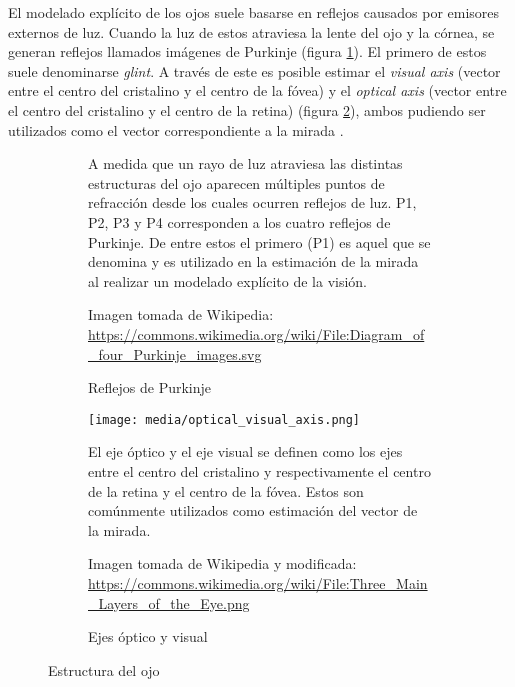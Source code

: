 El modelado explícito de los ojos suele basarse en reflejos causados por
emisores externos de luz.
Cuando la luz de estos atraviesa la lente del ojo y la córnea, se generan
reflejos llamados imágenes de Purkinje (figura \ref{fig:purkinje_images}).
El primero de estos suele denominarse \textit{glint}.
A través de este es posible estimar el \textit{visual axis} (vector entre el
centro del cristalino y el centro de la fóvea) y el \textit{optical axis}
(vector entre el centro del cristalino y el centro de la retina) (figura
\ref{fig:optical_visual_axis}), ambos pudiendo ser utilizados como el vector
correspondiente a la mirada \cite{hansen_2009_eye_of_the_beholder}.

\begin{figure}
    \centering

    \begin{subfigure}{\linewidth}
      \centering

      

      A medida que un rayo de luz atraviesa las distintas estructuras del ojo
      aparecen múltiples puntos de refracción desde los cuales ocurren reflejos
      de luz.
      P1, P2, P3 y P4 corresponden a los cuatro reflejos de Purkinje.
      De entre estos el primero (P1) es aquel que se denomina \glint
      y es utilizado en la estimación de la mirada al realizar un modelado
      explícito de la visión.

      Imagen tomada de Wikipedia:
      \url{https://commons.wikimedia.org/wiki/File:Diagram_of_four_Purkinje_images.svg}

      \caption{Reflejos de Purkinje}
      \label{fig:purkinje_images}
    \end{subfigure}

    \begin{subfigure}{0.7\linewidth}
      \centering

      \texttt{[image: media/optical\_visual\_axis.png]}

      El eje óptico y el eje visual se definen como los ejes entre el centro
      del cristalino y respectivamente el centro de la retina y el centro de la
      fóvea.
      Estos son comúnmente utilizados como estimación del vector de la mirada.

      Imagen tomada de Wikipedia y modificada:
      \url{https://commons.wikimedia.org/wiki/File:Three_Main_Layers_of_the_Eye.png}

      \caption{Ejes óptico y visual}
      \label{fig:optical_visual_axis}
    \end{subfigure}

    \caption{Estructura del ojo}
    \label{fig:eye-structure}
\end{figure}

